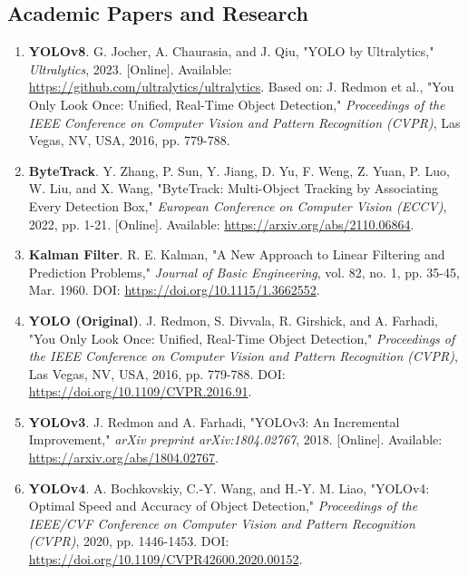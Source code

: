 
\subsection*{Academic Papers and Research}

\begin{enumerate}[resume]
    \item \textbf{YOLOv8}. G. Jocher, A. Chaurasia, and J. Qiu, "YOLO by Ultralytics," 
    \textit{Ultralytics}, 2023. [Online]. Available: \url{https://github.com/ultralytics/ultralytics}. 
    Based on: J. Redmon et al., "You Only Look Once: Unified, Real-Time Object Detection," 
    \textit{Proceedings of the IEEE Conference on Computer Vision and Pattern Recognition (CVPR)}, 
    Las Vegas, NV, USA, 2016, pp. 779-788.
    
    \item \textbf{ByteTrack}. Y. Zhang, P. Sun, Y. Jiang, D. Yu, F. Weng, Z. Yuan, 
    P. Luo, W. Liu, and X. Wang, "ByteTrack: Multi-Object Tracking by Associating Every Detection Box," 
    \textit{European Conference on Computer Vision (ECCV)}, 2022, pp. 1-21. 
    [Online]. Available: \url{https://arxiv.org/abs/2110.06864}.
    
    \item \textbf{Kalman Filter}. R. E. Kalman, "A New Approach to Linear Filtering and Prediction Problems," 
    \textit{Journal of Basic Engineering}, vol. 82, no. 1, pp. 35-45, Mar. 1960. 
    DOI: \url{https://doi.org/10.1115/1.3662552}.
    
    \item \textbf{YOLO (Original)}. J. Redmon, S. Divvala, R. Girshick, and A. Farhadi, 
    "You Only Look Once: Unified, Real-Time Object Detection," 
    \textit{Proceedings of the IEEE Conference on Computer Vision and Pattern Recognition (CVPR)}, 
    Las Vegas, NV, USA, 2016, pp. 779-788. DOI: \url{https://doi.org/10.1109/CVPR.2016.91}.
    
    \item \textbf{YOLOv3}. J. Redmon and A. Farhadi, "YOLOv3: An Incremental Improvement," 
    \textit{arXiv preprint arXiv:1804.02767}, 2018. [Online]. Available: 
    \url{https://arxiv.org/abs/1804.02767}.
    
    \item \textbf{YOLOv4}. A. Bochkovskiy, C.-Y. Wang, and H.-Y. M. Liao, "YOLOv4: Optimal Speed and Accuracy of Object Detection," 
    \textit{Proceedings of the IEEE/CVF Conference on Computer Vision and Pattern Recognition (CVPR)}, 
    2020, pp. 1446-1453. DOI: \url{https://doi.org/10.1109/CVPR42600.2020.00152}.
    

\end{enumerate}
